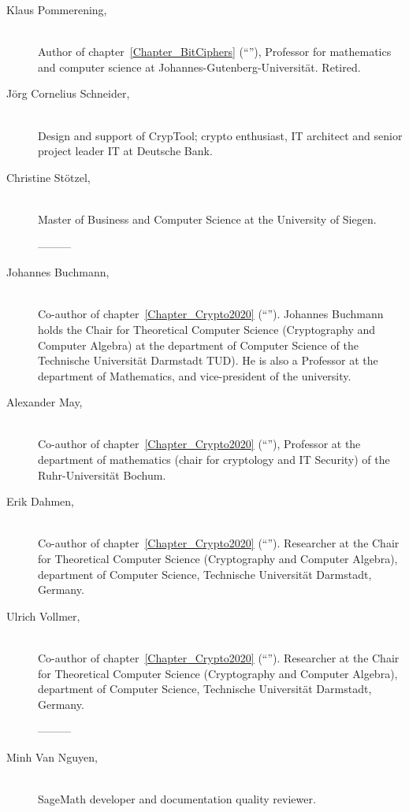 \begin{description}
\item[Klaus Pommerening,] \mbox{}\\
Author of chapter~\ref{Chapter_BitCiphers} (``''), 
Professor for mathematics and computer science at Johannes-Gutenberg-Universit\"at. Retired.

\item[J\"org Cornelius Schneider,] \mbox{}\\
Design and support of CrypTool; crypto enthusiast, IT architect and
senior project leader IT at Deutsche Bank.

\item[Christine St\"otzel,] \mbox{}\\
Master of Business and Computer Science at the University of Siegen.

---------

\item[Johannes Buchmann,] \mbox{}\\
Co-author of chapter~\ref{Chapter_Crypto2020} (``'').
Johannes Buchmann holds the Chair for Theoretical Computer Science (Cryptography
and Computer Algebra) at the department of Computer Science of the Technische
Universit\"at Darmstadt TUD).  He is also a Professor at the department of Mathematics, and vice-president of the university.

\item[Alexander May,] \mbox{}\\
Co-author of chapter~\ref{Chapter_Crypto2020} (``''), 
Professor at the department of mathematics (chair for cryptology and
IT Security) of the Ruhr-Universit\"at Bochum.


\item[Erik Dahmen,] \mbox{}\\
Co-author of chapter~\ref{Chapter_Crypto2020} (``''). 
Researcher at the Chair for Theoretical Computer Science (Cryptography and
Computer Algebra), department of Computer Science, Technische Universit\"at
Darmstadt, Germany.

\item[Ulrich Vollmer,] \mbox{}\\
Co-author of chapter~\ref{Chapter_Crypto2020} (``'').
Researcher at the Chair for Theoretical Computer Science (Cryptography and
Computer Algebra), department of Computer Science, Technische Universit\"at
Darmstadt, Germany.

---------

\item[Minh Van Nguyen,] \mbox{}\\
SageMath developer and documentation quality reviewer.



\end{description}

